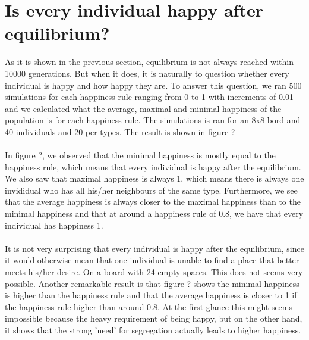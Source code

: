 \documentclass{article}
\begin{document}
\section{Is every individual happy after equilibrium?}
As it is shown in the previous section, equilibrium is not always reached within 10000 generations. But when it does, it is naturally to question whether every individual is happy and how happy they are. To answer this question, we ran 500 simulations for each happiness rule ranging from 0 to 1 with increments of 0.01 and we calculated what the average, maximal and minimal happiness of the population is for each happiness rule. The simulations is ran for an 8x8 bord and 40 individuals and 20 per types. The result is shown in figure ?\\
\\
In figure ?, we observed that the minimal happiness is mostly equal to the happiness rule, which means that every individual is happy after the equilibrium. We also saw that maximal happiness is always 1, which means there is always one invididual who has all his/her neighbours of the same type. Furthermore, we see that the average happiness is always closer to the maximal happiness than to the minimal happiness and that at around a happiness rule of 0.8, we have that every individual has happiness 1.\\
\\
It is not very surprising that every individual is happy after the equilibrium, since it would otherwise mean that one individual is unable to find a place that better meets his/her desire. On a board with 24 empty spaces. This does not seems very possible. Another remarkable result is that figure ? shows the minimal happiness is higher than the happiness rule and that the average happiness is closer to 1 if the happiness rule higher than around 0.8. At the first glance this might seems impossible because the heavy requirement of being happy, but on the other hand, it shows that the strong 'need' for segregation actually leads to higher happiness.
\end{document}
